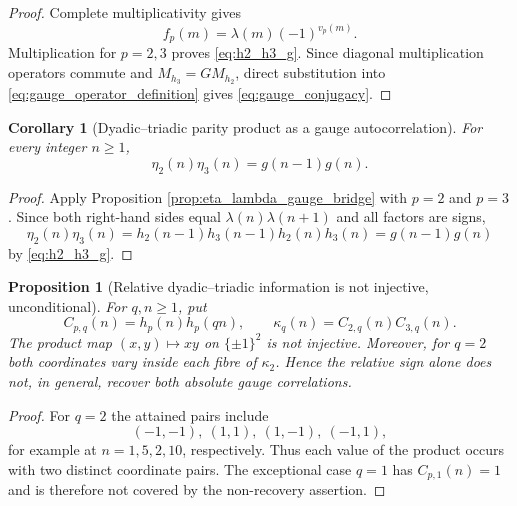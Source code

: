 \documentclass[11pt]{amsart}
\numberwithin{equation}{section}
\theoremstyle{plain}
\newtheorem{proposition}[theorem]{Proposition}
\newtheorem{corollary}[theorem]{Corollary}
\theoremstyle{definition}
\theoremstyle{remark}
\newcommand{\liou}{\lambda}
\begin{document}
\begin{proof}
Complete multiplicativity gives
\begin{equation}
f_p(m)=\liou(m)(-1)^{v_p(m)}.
\label{eq:fp_complete_multiplicativity}
\end{equation}
Multiplication for $p=2,3$ proves \eqref{eq:h2_h3_g}.  Since diagonal multiplication operators commute and $M_{h_3}=GM_{h_2}$, direct substitution into \eqref{eq:gauge_operator_definition} gives \eqref{eq:gauge_conjugacy}.
\end{proof}

\begin{corollary}[Dyadic--triadic parity product as a gauge autocorrelation]
\label{cor:eta2_eta3_g}
For every integer $n\ge1$,
\begin{equation}
\eta_2(n)\eta_3(n)=g(n-1)g(n).
\label{eq:eta2_eta3_g}
\end{equation}
\end{corollary}

\begin{proof}
Apply Proposition \ref{prop:eta_lambda_gauge_bridge} with $p=2$ and $p=3$.  Since both right-hand sides equal $\liou(n)\liou(n+1)$ and all factors are signs,
\begin{equation}
\eta_2(n)\eta_3(n)
=h_2(n-1)h_3(n-1)h_2(n)h_3(n)
=g(n-1)g(n)
\end{equation}
by \eqref{eq:h2_h3_g}.
\end{proof}

\begin{proposition}[Relative dyadic--triadic information is not injective, unconditional]
\label{prop:relative_not_absolute}
For $q,n\ge1$, put
\begin{equation}
C_{p,q}(n)=h_p(n)h_p(qn),
\qquad
\kappa_q(n)=C_{2,q}(n)C_{3,q}(n).
\label{eq:gauge_correlations}
\end{equation}
The product map $(x,y)\mapsto xy$ on $\{\pm1\}^2$ is not injective.  Moreover, for $q=2$ both coordinates vary inside each fibre of $\kappa_2$.  Hence the relative sign alone does not, in general, recover both absolute gauge correlations.
\end{proposition}

\begin{proof}
For $q=2$ the attained pairs include
\begin{equation}
(-1,-1),\ (1,1),\ (1,-1),\ (-1,1),
\end{equation}
for example at $n=1,5,2,10$, respectively.  Thus each value of the product occurs with two distinct coordinate pairs.  The exceptional case $q=1$ has $C_{p,1}(n)=1$ and is therefore not covered by the non-recovery assertion.
\end{proof}
\end{document}
